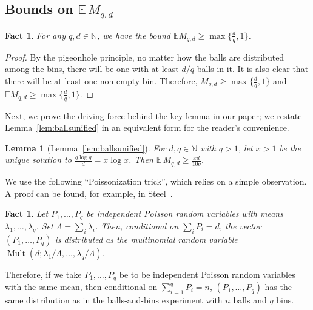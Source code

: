 \documentclass[12pt,reqno]{amsart}
\newtheorem{lemma}[theorem]{Lemma}
\newtheorem{fact}[theorem]{Fact}
\theoremstyle{remark}
\numberwithin{theorem}{section}
\renewcommand{\(}{\bigl(}
\renewcommand{\)}{\bigr)\vphantom{)}}
\renewcommand{\geq}{\ge}
\renewcommand{\ge}{\geqslant}
\DeclareMathOperator{\Mult}{Mult}
\newcommand{\NN}{\mathbb{N}}
\begin{document}
\subsection{Bounds on $\mathbb{E}\, M_{q,d}$}\label{sec:appMbound}

\begin{fact}\label{fact:W-ez}
    For any $q,d\in \NN$, we have the bound $\mathbb{E} M_{q,d} \geq \max\big\{ \tfrac{d}{q}, 1 \big\}$.
\end{fact}
\begin{proof}
    By the pigeonhole principle, no matter how the balls are distributed among the bins, there will be one with at least $d/q$ balls in it. It is also clear that there will be at least one non-empty bin. Therefore, $M_{q,d} \geq \max\big\{ \tfrac{d}{q}, 1 \big\}$ and $\mathbb{E} M_{q,d} \geq \max\big\{ \tfrac{d}{q}, 1 \big\}$.
\end{proof}

Next, we prove the driving force behind the key lemma in our paper; we restate Lemma~\ref{lem:ballsunified} in an equivalent form for the reader's convenience. 

\begin{lemma}[Lemma~\ref{lem:ballsunified}]\label{lem:ballsunifed-appendix}
   For $d,q \in \NN$ with $q > 1$, let $x>1$ be the unique solution to $\frac{q \log q}{d}=x \log x$. Then $\mathbb{E}\,M_{q,d} \geq \frac{xd}{10q}$.
\end{lemma}

We use the following ``Poissonization trick'', which relies on a simple observation. 
A proof can be found, for example, in Steel~\cite{Steel53}.

\begin{fact}
Let $P_1,\dots,P_q$ be independent Poisson random variables with means $\lambda_1,\dots,\lambda_q$. Set $\Lambda=\sum_i \lambda_i$. Then, conditional on $\sum_i P_i=d$, the vector $(P_1,\dots,P_q)$ is distributed as the multinomial random variable $\Mult\!\left(d;\lambda_1/\Lambda,\dots,\lambda_q/\Lambda\right)$. 
\end{fact}


Therefore, if we take $P_1,\dots,P_q$ be to be independent Poisson random variables with the same mean, then conditional on $\sum_{i=1}^q P_i  = n$, $(P_1,\dots,P_q)$ has the same distribution as in the balls-and-bins experiment with $n$ balls and $q$ bins.
\end{document}
